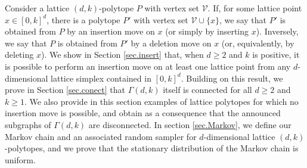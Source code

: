 \documentclass[a4paper]{article}
\begin{document}
Consider a lattice $(d,k)$-polytope $P$ with vertex set $\mathcal{V}$. If, for some lattice point $x\in[0,k]^d$, there is a polytope $P'$ with vertex set $\mathcal{V}\cup\{x\}$, we say that $P'$ is obtained from $P$ by an insertion move on $x$ (or simply by inserting $x$). Inversely, we say that $P$ is obtained from $P'$ by a deletion move on $x$ (or, equivalently, by deleting $x$). We show in Section \ref{sec.insert} that, when $d\geq2$ and $k$ is positive, it is possible to perform an insertion move on at least one lattice point from any $d$-dimensional lattice simplex contained in $[0,k]^d$. Building on this result, we prove in Section \ref{sec.conect} that $\Gamma(d,k)$ itself is connected for all $d\geq2$ and $k\geq1$. We also provide in this section examples of lattice polytopes for which no insertion move is possible, and obtain as a consequence that the announced subgraphs of $\Gamma(d,k)$ are disconnected. In section \ref{sec.Markov}, we define our Markov chain and an associated random sampler for $d$-dimensional lattice $(d,k)$-polytopes, and we prove that the stationary distribution of the Markov chain is uniform.

%
\end{document}
